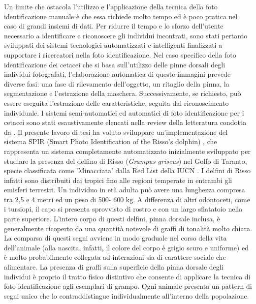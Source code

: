 \documentclass[a4paper,12pt]{report}
\begin{document}
  Un limite che ostacola l'utilizzo e l'applicazione della tecnica della foto identificazione manuale è che essa
  richiede molto tempo ed è poco pratica nel caso di grandi insiemi di dati. Per ridurre il tempo e lo sforzo dell'utente necessario a
  identificare e riconoscere gli individui incontrati, sono stati pertanto sviluppati dei sistemi tecnologici automatizzati e intelligenti
  finalizzati a supportare i ricercatori nella foto identificazione. Nel caso specifico della foto identificazione dei cetacei che si basa sull'utilizzo
  delle pinne dorsali degli individui fotografati, l'elaborazione automatica di queste immagini prevede diverse fasi: una fase di rilevamento dell'oggetto, un ritaglio della pinna, la segmentazione e l'estrazione della maschera. Successivamente, 
  se richiesto, può essere eseguita l'estrazione delle caratteristiche, seguita dal riconoscimento individuale. I sistemi semi-automatici ed automatici di foto identificazione
  per i cetacei sono stati esaustivamente elencati nella review della letteratura condotta da \cite{maglietta2022machine}. 
  Il presente lavoro di tesi ha voluto sviluppare un'implementazione del sistema SPIR (Smart Photo Identification of the Risso’s dolphin) \cite{maglietta2018dolfin}, 
  che rappresenta un sistema completamente automatizzato inizialmente sviluppato
  per studiare la presenza del delfino di Risso (\textit{Grampus griseus}) nel Golfo di Taranto, specie classificata come 'Minacciata' dalla Red List della IUCN \cite{lanfredi2021grampus}. 
  I delfini di Risso infatti sono distribuiti dai 
  tropici fino alle regioni temperate in entrambi gli emisferi terrestri. Un individuo in 
  età adulta può avere una lunghezza compresa tra 2,5 e 4 metri ed un peso di 500-
  600 kg. A differenza di altri odontoceti, come i tursiopi, il capo si presenta sprovvisto di rostro 
  e con un largo sfiatatoio nella parte superiore. L’intero corpo di questi delfini, pinna dorsale 
  inclusa, è generalmente ricoperto da una quantità notevole di graffi di tonalità 
  molto chiara. La comparsa di questi segni avviene in modo graduale nel corso della 
  vita dell’animale (alla nascita, infatti, il colore del corpo è grigio scuro e uniforme) ed è molto probabilmente 
  collegata ad interazioni sia di carattere sociale che alimentare. La presenza di graffi sulla superficie della pinna dorsale degli individui è proprio 
  il tratto fisico distintivo che consente di 
  applicare la tecnica di foto-identificazione agli esemplari di grampo. Ogni animale presenta un pattern di segni unico che lo 
  contraddistingue individualmente all'interno della popolazione.
\end{document}
